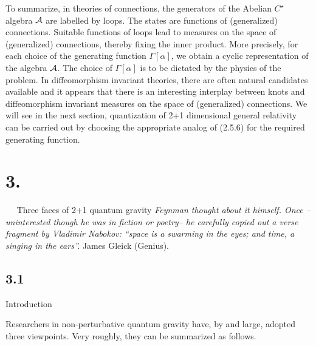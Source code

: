 To summarize, in theories of connections, the generators of the Abelian
$C^\star$ algebra ${\cal A}$ are labelled by loops. The states are
functions of (generalized) connections. Suitable functions of loops lead
to measures on the space of (generalized) connections, thereby fixing the
inner product. More precisely, for each choice of the generating function
$\Gamma[\alpha]$, we obtain a cyclic representation of the algebra ${\cal A}$.
The choice of $\Gamma[\alpha]$ is to be dictated by the physics of the
problem. In diffeomorphism invariant theories, there are often natural
candidates available and it appears that there is an interesting interplay
between knots and diffeomorphism invariant measures on the space of
(generalized) connections. We will see in the next section, quantization of
2+1 dimensional general relativity can be carried out by choosing the
appropriate analog of (2.5.6) for the required generating function.

\goodbreak
\vfill\break

%
\def\A{A_a^I} \def\E{\tw{E}{}^a_I}

\section{3.}{${}\quad$ Three faces of 2+1 quantum gravity}%
\medskip
{\narrower\narrower\smallskip\noindent
{\sl Feynman thought about it himself. Once --uninterested though he was in
fiction or poetry-- he carefully copied out a verse fragment by Vladimir
Nabokov: ``space is a swarming in the eyes; and time, a singing in the ears''.}
\smallskip
James Gleick (Genius).\smallskip}

\subsection{3.1}{Introduction}%

Researchers in non-perturbative quantum gravity have, by and large, adopted
three viewpoints. Very roughly, they can be summarized as follows.

